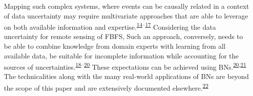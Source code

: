 \documentclass[12pt,oneside]{article}
\begin{document}
Mapping such complex systems, where events can be causally related in a
context of data uncertainty may require multivariate approaches that are
able to leverage on both available information and
expertise.\textsuperscript{\protect\hyperlink{ref-Hubbard_2014}{14}--\protect\hyperlink{ref-Whitney_et_al_2018}{17}}
Considering the data uncertainty for remote sensing of FBFS, Such an
approach, conversely, needs to be able to combine knowledge from domain
experts with learning from all available data, be suitable for
incomplete information while accounting for the sources of
uncertainties.\textsuperscript{\protect\hyperlink{ref-Kuhnert_2011}{18}--\protect\hyperlink{ref-Whitney_et_al_2018a}{20}}
These expectations can be achieved using
BNs.\textsuperscript{\protect\hyperlink{ref-Whitney_et_al_2018a}{20},\protect\hyperlink{ref-Yet_et_al_2016}{21}}
The technicalities along with the many real-world applications of BNs
are beyond the scope of this paper and are extensively documented
elsewhere.\textsuperscript{\protect\hyperlink{ref-Pourret_et_al_2008}{22}}
\end{document}
